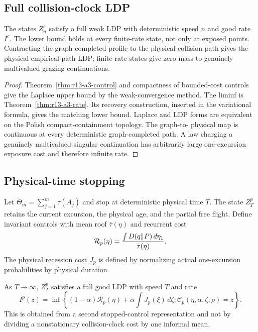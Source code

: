 \subsection{Full collision-clock LDP}

\begin{theorem}
\label{thm:r13-a3-collision}
The states $Z_n^c$ satisfy a full weak LDP with deterministic speed $n$ and
good rate $I^c$.  The lower bound holds at every finite-rate state, not only
at exposed points.  Contracting the graph-completed profile to the physical
collision path gives the physical empirical-path LDP; finite-rate states give
zero mass to genuinely multivalued grazing continuations.
\end{theorem}

\begin{proof}
Theorem~\ref{thm:r13-a3-control} and compactness of bounded-cost controls give
the Laplace upper bound by the weak-convergence method.  The liminf is
Theorem~\ref{thm:r13-a3-rate}.  Its recovery construction, inserted in the
variational formula, gives the matching lower bound.  Laplace and LDP forms
are equivalent on the Polish compact-containment topology.  The graph-to-
physical map is continuous at every deterministic graph-completed path.  A
law charging a genuinely multivalued singular continuation has arbitrarily
large one-excursion exposure cost and therefore infinite rate.
\end{proof}

\subsection{Physical-time stopping}

Let
$\Theta_m=\sum_{j=1}^m\tau(A_j)$ and stop at deterministic physical time $T$.
The state $Z_T^p$ retains the current excursion, the physical age, and the
partial free flight.  Define invariant controls with mean roof
$\bar\tau(\eta)$ and recurrent cost
\[
 \mathcal R_p(\eta)=
 {\int D(q\Vert P)\,d\eta_1\over\bar\tau(\eta)}.
\]
The physical recession cost $J_p$ is defined by normalizing actual
one-excursion probabilities by physical duration.

\begin{theorem}
\label{thm:r13-a3-physical}
As $T\to\infty$, $Z_T^p$ satisfies a full good LDP with speed $T$ and rate
\[
 I^p(z)=\inf\left\{(1-\alpha)\mathcal R_p(\eta)+
 \alpha\int J_p(\xi)\,d\zeta:
 \mathcal C_p(\eta,\alpha,\zeta,\rho)=z\right\}.
\]
This is obtained from a second stopped-control representation and not by
dividing a nonstationary collision-clock cost by one informal mean.
\end{theorem}

